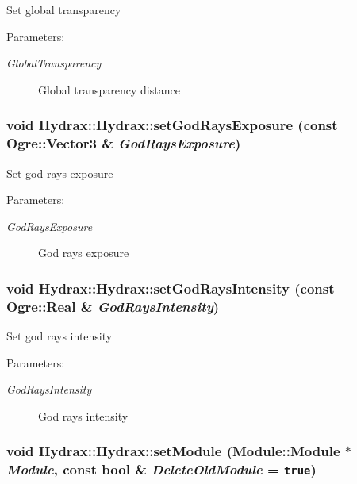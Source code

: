 Set global transparency \begin{Desc}
\item[Parameters:]
\begin{description}
\item[{\em GlobalTransparency}]Global transparency distance \end{description}
\end{Desc}
\hypertarget{class_hydrax_1_1_hydrax_496d60d593ecf694a5a701d5a42f27b1}{
\subsubsection[{setGodRaysExposure}]{\setlength{\rightskip}{0pt plus 5cm}void Hydrax::Hydrax::setGodRaysExposure (const Ogre::Vector3 \& {\em GodRaysExposure})}}
\label{class_hydrax_1_1_hydrax_496d60d593ecf694a5a701d5a42f27b1}


Set god rays exposure \begin{Desc}
\item[Parameters:]
\begin{description}
\item[{\em GodRaysExposure}]God rays exposure \end{description}
\end{Desc}
\hypertarget{class_hydrax_1_1_hydrax_fbc9ef3ee75b67003c04e67db2ef223e}{
\subsubsection[{setGodRaysIntensity}]{\setlength{\rightskip}{0pt plus 5cm}void Hydrax::Hydrax::setGodRaysIntensity (const Ogre::Real \& {\em GodRaysIntensity})}}
\label{class_hydrax_1_1_hydrax_fbc9ef3ee75b67003c04e67db2ef223e}


Set god rays intensity \begin{Desc}
\item[Parameters:]
\begin{description}
\item[{\em GodRaysIntensity}]God rays intensity \end{description}
\end{Desc}
\hypertarget{class_hydrax_1_1_hydrax_3f678db49fe45320efb237d145ec63e4}{
\subsubsection[{setModule}]{\setlength{\rightskip}{0pt plus 5cm}void Hydrax::Hydrax::setModule ({\bf Module::Module} $\ast$ {\em Module}, \/  const bool \& {\em DeleteOldModule} = {\tt true})}}
\label{class_hydrax_1_1_hydrax_3f678db49fe45320efb237d145ec63e4}


